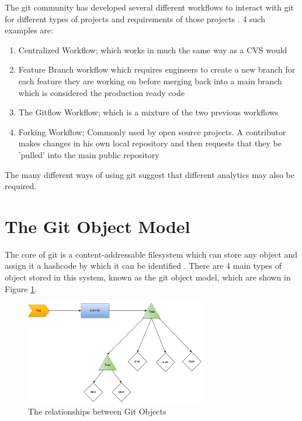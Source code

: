 \documentclass[11pt]{book}
\begin{document}
The git community has developed several different workflows to interact with git for different types of projects and requirements of those projects \cite{gitcomparingworkflows}. 4 such examples are: 

\begin{enumerate}
	\item Centralized Workflow; which works in much the same way as a CVS would
	\item Feature Branch workflow which requires engineers to create a new branch for each feature they are working on before merging back into a main branch which is considered the production ready code
	\item The Gitflow Workflow; which is a mixture of the two previous workflows
	\item Forking Workflow; Commonly used by open source projects. A contributor makes changes in his own local repository and then requests that they be 'pulled' into the main public repository
\end{enumerate}

The many different ways of using git suggest that different analytics may also be required.

\clearpage

\section{The Git Object Model}
The core of git is a content-addressable filesystem which can store any object and assign it a hashcode by which it can be identified \cite{progit}. There are 4 main types of object stored in this system, known as the git object model, which are shown in Figure \ref{fig:gitobjectmodeldiagram}.

\begin{figure}[h]
	\centering
	\includegraphics[width=0.7\textwidth]{images/gitobjectmodel}
	\caption{The relationships between Git Objects}
	\label{fig:gitobjectmodeldiagram}
\end{figure} 
\end{document}
